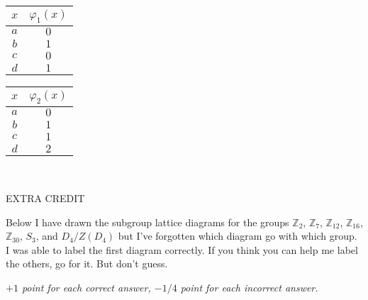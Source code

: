 \documentclass[fleqn,12pt]{article}
\newcommand{\<}{\ensuremath{\langle}}
\renewcommand{\>}{\ensuremath{\rangle}}
\newcommand{\Z}{\ensuremath{\mathbb{Z}}}
\begin{document}
\begin{enumerate}[{\bf 1.}]
\begin{enumerate}
\medskip
\begin{center}
\begin{tabular}{c|c}
  $x$ & $\varphi_1(x)$ \\
\hline
  $a$ & $0$\\\hline
  $b$ & $1$\\\hline
  $c$ & $0$\\\hline
  $d$ & $1$
\end{tabular}
\hskip3cm
\begin{tabular}{c|c}
  $x$ & $\varphi_2(x)$ \\
\hline
  $a$ & $0$\\\hline
  $b$ & $1$\\\hline
  $c$ & $1$\\\hline
  $d$ & $2$
\end{tabular}
\end{center}
\end{enumerate}
  \end{enumerate}

\newpage
~

\newpage

\begin{center}
  EXTRA CREDIT
\end{center}
Below I have drawn the subgroup lattice diagrams for the groups $\Z_2$,
$\Z_7$, $\Z_{12}$, $\Z_{16}$, $\Z_{30}$, $S_3$, and  $D_4/Z(D_4)$ but I've
forgotten which diagram go with which group.  I was able to label the first
diagram correctly.  If you think you can help me label the others, go for
it. But don't guess. 

\medskip

{\it $+1$ point for each correct answer, $-1/4$ point for each incorrect answer.} 

\bigskip
\end{document}
